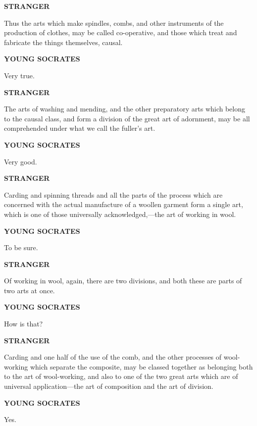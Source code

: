 \documentclass[11pt,letter]{article}
\begin{document}
\par \textbf{STRANGER}
\par   Thus the arts which make spindles, combs, and other instruments of the production of clothes, may be called co-operative, and those which treat and fabricate the things themselves, causal.

\par \textbf{YOUNG SOCRATES}
\par   Very true.

\par \textbf{STRANGER}
\par   The arts of washing and mending, and the other preparatory arts which belong to the causal class, and form a division of the great art of adornment, may be all comprehended under what we call the fuller's art.

\par \textbf{YOUNG SOCRATES}
\par   Very good.

\par \textbf{STRANGER}
\par   Carding and spinning threads and all the parts of the process which are concerned with the actual manufacture of a woollen garment form a single art, which is one of those universally acknowledged,—the art of working in wool.

\par \textbf{YOUNG SOCRATES}
\par   To be sure.

\par \textbf{STRANGER}
\par   Of working in wool, again, there are two divisions, and both these are parts of two arts at once.

\par \textbf{YOUNG SOCRATES}
\par   How is that?

\par \textbf{STRANGER}
\par   Carding and one half of the use of the comb, and the other processes of wool-working which separate the composite, may be classed together as belonging both to the art of wool-working, and also to one of the two great arts which are of universal application—the art of composition and the art of division.

\par \textbf{YOUNG SOCRATES}
\par   Yes.
\end{document}
